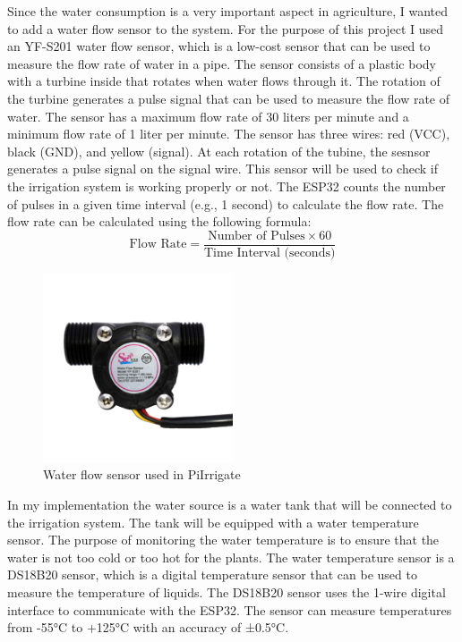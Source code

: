 Since the water consumption is a very important aspect in agriculture, 
I wanted to add a water flow sensor to the system. For the purpose of this project I used an 
YF-S201 water flow sensor, which is a low-cost sensor that can be used to measure the flow rate of water in a pipe.
The sensor consists of a plastic body with a 
turbine inside that rotates when water flows through it.
The rotation of the turbine generates a pulse signal that can be used to measure the 
flow rate of water.
The sensor has a maximum flow rate of 30 liters per minute and a minimum 
flow rate of 1 liter per minute.
The sensor has three wires: red (VCC), black (GND), and yellow (signal).
At each rotation of the tubine, the sesnsor generates a pulse signal on the signal wire.
This sensor will be used to check if the irrigation system is working properly or not.
The ESP32 counts the number of pulses in a given time interval 
(e.g., 1 second) to calculate the flow rate.
The flow rate can be calculated using the following formula:
\begin{equation}
    \text{Flow Rate} = \frac{\text{Number of Pulses} \times 60}{\text{Time Interval (seconds)}}
\end{equation}
\begin{figure}[H]
    \centering
    \includegraphics[width=0.5\textwidth]{images/water-flow.jpg}
    \caption{Water flow sensor used in PiIrrigate}
    \label{fig:water-flow-sensor}
\end{figure}

In my implementation the water source is a water tank that will be connected to the irrigation system.
The tank will be equipped with a water temperature sensor. The purpose
of monitoring the water temperature is to ensure that the water is not too cold or too hot for the plants.
The water temperature sensor is a DS18B20 sensor, which is a digital temperature sensor that can be used to measure the temperature of liquids.
The DS18B20 sensor uses the 1-wire digital interface to communicate with the ESP32.
The sensor can measure temperatures from -55°C to +125°C with an accuracy of ±0.5°C.

